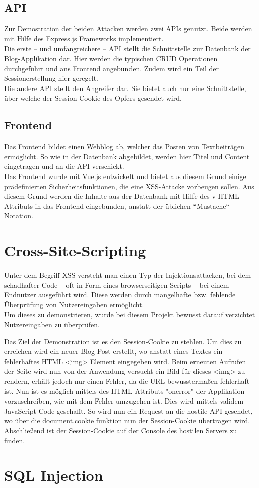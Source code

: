 \subsection{API}
Zur Demostration der beiden Attacken werden zwei APIs genutzt. Beide werden mit Hilfe des Express.js Frameworks implementiert. \\
Die erste – und umfangreichere – API stellt die Schnittstelle zur Datenbank der Blog-Applikation dar. Hier werden die typischen CRUD Operationen durchgeführt und ans Frontend angebunden. Zudem wird ein Teil der Sessionerstellung hier geregelt. \\
Die andere API stellt den Angreifer dar. Sie bietet auch nur eine Schnittstelle, über welche der Session-Cookie des Opfers gesendet wird. 
\subsection{Frontend}
Das Frontend bildet einen Webblog ab, welcher das Posten von Textbeiträgen ermöglicht. So wie in der Datenbank abgebildet, werden hier Titel und Content eingetragen und an die API verschickt. \\
Das Frontend wurde mit Vue.js entwickelt und bietet aus diesem Grund einige prädefinierten Sicherheitsfunktionen, die eine \ac{XSS}-Attacke vorbeugen sollen. 
Aus diesem Grund werden die Inhalte aus der Datenbank mit Hilfe des v-HTML Attributs in das Frontend eingebunden, anstatt der üblichen ``Mustache`` Notation.
\section{Cross-Site-Scripting}

Unter dem Begriff \ac{XSS} versteht man einen Typ der Injektionsattacken, bei dem schadhafter Code – oft in Form eines browserseitigen Scripts – bei einem Endnutzer ausgeführt wird. Diese werden durch mangelhafte bzw. fehlende Überprüfung von Nutzereingaben ermöglicht. \\
Um dieses zu demonstrieren, wurde bei diesem Projekt bewusst darauf verzichtet Nutzereingaben zu überprüfen. 

Das Ziel der Demonstration ist es den Session-Cookie zu stehlen. Um dies zu erreichen wird ein neuer Blog-Post erstellt, wo anstatt eines Textes ein fehlerhaftes HTML <img> Element eingegeben wird. Beim erneuten Aufrufen der Seite wird nun von der Anwendung versucht ein Bild für dieses <img> zu rendern, erhält jedoch nur einen Fehler, da die URL bewusstermaßen fehlerhaft ist. 
Nun ist es möglich mittels des HTML Attributs "onerror" der Applikation vorzuschreiben, wie mit dem Fehler umzugehen ist. Dies wird mittels validem JavaScript Code geschafft. So wird nun ein Request an die hostile API gesendet, wo über die document.cookie funktion nun der Session-Cookie übertragen wird. 
Abschließend ist der Session-Cookie auf der Console des hostilen Servers zu finden.

\section{SQL Injection}